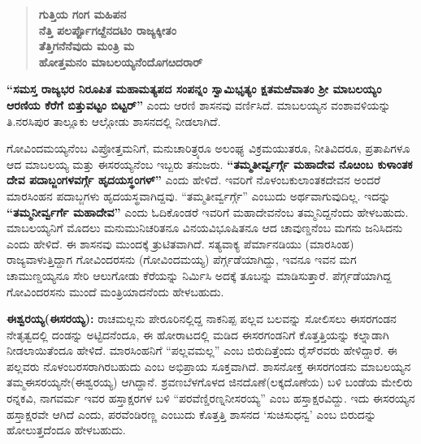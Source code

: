 \vskip 2pt

\begin{verse}
\textbf{ಗುತ್ತಿಯ ಗಂಗ ಮಹಿಪನ} \\\textbf{ನೆತ್ತಿ ಪಲರ್ಪ್ಪೊಗೞ್ದೆನದಟಿಂ ರಾಜ್ಯಕ್ಕೀತಂ} \\\textbf{ ತೆತ್ತಿಗನೆನೆವುದು ಮಂತ್ರಿ ಮ} \\\textbf{ ಹೋತ್ತಮನಂ ಮಾಬಲಯ್ಯನೆಂದೊಗೞದರಾರ್​}
\end{verse}

\vskip 2pt

\textbf{“ಸಮಸ್ತ ರಾಜ್ಯಭರ ನಿರೂಪಿತ ಮಹಾಮತ್ಯಪದ ಸಂಪನ್ನಂ ಸ್ವಾಮಿಭೃತ್ಯಂ ಕ್ಷತಮಱೆವಾತಂ ಶ‍್ರೀ ಮಾಬಲಯ್ಯಂ ಆರಣಿಯ ಕೆರೆಗೆ ಬಿತ್ತುವಟ್ಟಂ ಬಿಟ್ಟರ್​”} ಎಂದು ಆರಣಿ ಶಾಸನವು ವರ್ಣಿಸಿದೆ. ಮಾಬಲಯ್ಯನ ವಂಶಾವಳಿಯನ್ನು ತಿ.ನರಸಿಪುರ ತಾಲ್ಲೂಕು ಆಲ್ಗೋಡು ಶಾಸನದಲ್ಲಿ ನೀಡಲಾಗಿದೆ.

\vskip 2pt

ಗೋವಿಂದಮಯ್ಯನೆಂಬ ವಿಪ್ರೋತ್ತಮನಿಗೆ, ಮನುಚಾರಿತ್ರ್ಯರೂ ಅಲಂಘ್ಯ ವಿಕ್ರಮಯುತರೂ, ನೀತಿವಿದರೂ, ಪ್ರತಾಪಿಗಳೂ ಆದ ಮಾಬಲಯ್ಯ ಮತ್ತು ಈಸರಯ್ಯನೆಂಬ ಇಬ್ಬರು ತನುಜರು. \textbf{“ತಮ್ಮತೀರ್ವ್ವರ್ಗ್ಗೆ ಮಹಾದೇವ ನೊೞಂಬ ಕುಳಾಂತಕ ದೇವ ಪದಾಬ್ಜಂಗಳವರ್ಗ್ಗೆ ಹೃದಯಸ್ಥಂಗಳ್​”} ಎಂದು ಹೇಳಿದೆ. ಇವರಿಗೆ ನೊಳಂಬಕುಲಾಂತಕದೇವನ ಅಂದರೆ ಮಾರಸಿಂಹನ ಪದಾಬ್ಜಗಳು ಹೃದಯಸ್ಥವಾಗಿದ್ದವು. “ತಮ್ಮತೀರ್ವ್ವರ್ಗ್ಗೆ” ಎಂಬುದು ಅರ್ಥವಾಗುವುದಿಲ್ಲ. ಇದನ್ನು \textbf{“ತಮ್ಮನೀರ್ವ್ವರ್ಗೆ ಮಹಾದೇವ”} ಎಂದು ಓದಿಕೊಂಡರೆ ಇವರಿಗೆ ಮಹಾದೇವನೆಂಬ ತಮ್ಮನಿದ್ದನೆಂದು ಹೇಳಬಹುದು. ಮಾಬಲಯ್ಯನಿಗೆ ಮೊದಲು ಮನುಮುನಿಚರಿತನೂ ವಿನಯವಿಭೂಷಿತನೂ ಆದ ಚಾವುಣ್ಡನೆಂಬ ಮಗನು ಜನಿಸಿದನು ಎಂದು ಹೇಳಿದೆ. ಈ ಶಾಸನವು ಮುಂದಕ್ಕೆ ತ್ರುಟಿತವಾಗಿದೆ. ಸತ್ಯವಾಕ್ಯ ಪೆರ್ಮಾನಡಿಯು (ಮಾರಸಿಂಹ) ರಾಜ್ಯವಾಳುತ್ತಿದ್ದಾಗ ಗೋವಿಂದರಸನು (ಗೋವಿಂದಮಯ್ಯ) ಪೆರ್ಗ್ಗಡೆಯಾಗಿದ್ದು, ಇವನೂ ಇವನ ಮಗ ಚಾಮುಣ್ಡಯ್ಯನೂ ಸೇರಿ ಆಲುಗೋಡು ಕೆರೆಯನ್ನು ನಿರ್ಮಿಸಿ ಅದಕ್ಕೆ ತೂಬನ್ನು ಮಾಡಿಸುತ್ತಾರೆ. ಪೆರ್ಗ್ಗಡೆಯಾಗಿದ್ದ ಗೋವಿಂದರಸನು ಮುಂದೆ ಮಂತ್ರಿಯಾದನೆಂದು ಹೇಳಬಹುದು.

\newpage

\textbf{ಈಶ್ವರಯ್ಯ(ಈಸರಯ್ಯ): }ರಾಚಮಲ್ಲನು ಪೇರೂರಿನಲ್ಲಿದ್ದ ನಾಕನಿಪ್ಪ ಪಲ್ಲವ ಬಲವನ್ನು ಸೋಲಿಸಲು ಈಸರಗಂಡನ ನೇತೃತ್ವದಲ್ಲಿ ದಂಡನ್ನು ಅಟ್ಟಿದನೆಂದೂ, ಈ ಹೋರಾಟದಲ್ಲಿ ಮಡಿದ ಈಸರಗಂಡನಿಗೆ ಕೊತ್ತತ್ತಿಯನ್ನು ಕಲ್ನಾಡಾಗಿ ನೀಡಲಾಯಿ\-ತೆಂದೂ ಹೇಳಿದೆ. ಮಾರಸಿಂಹನಿಗೆ “ಪಲ್ಲವಮಲ್ಲ” ಎಂಬ ಬಿರುದಿತ್ತೆಂದು ರೈಸ್​ರವರು ಹೇಳಿದ್ದಾರೆ. ಈ ಪಲ್ಲವರು ನೊಳಂಬರಸರಾಗಿರಬಹುದು ಎಂಬ ಅಭಿಪ್ರಾಯ ಸೂಕ್ತವಾಗಿದೆ. ಶಾಸನೋಕ್ತ ಈಸರಗಂಡನು ಮಾಬಲಯ್ಯನ ತಮ್ಮ\break ಈಸರಯ್ಯನೇ(ಈಶ್ವರಯ್ಯ) ಆಗಿದ್ದಾನೆ. ಶ್ರವಣಬೆಳಗೊಳದ ಜಿನದೊಣೆ(ಲಕ್ಕದೊಣೆಯ) ಬಳಿ ಬಂಡೆಯ ಮೇಲಿರು ರನ್ನಕವಿ, ನಾಗವರ್ಮ ಇವರ ಹಸ್ತಾಕ್ಷರಗಳ ಬಳಿ “ಪರವೆಣ್ಡಿರಣ್ನನೀಸರಯ್ಯ” ಎಂಬ ಹಸ್ತಾಕ್ಷರವಿದ್ದು. ಇದು ಈಸರಯ್ಯನ ಹಸ್ತಾಕ್ಷರವೇ ಆಗಿದೆ ಎಂದು, ಪರವೆಂಡಿರಣ್ಣ ಎಂಬುದು ಕೊತ್ತತ್ತಿ ಶಾಸನದ ‘ಸುಚಿಸುಧನ್ವ’ ಎಂಬ ಬಿರುದನ್ನು ಹೋಲುತ್ತದೆಂದೂ ಹೇಳಬಹುದು.

